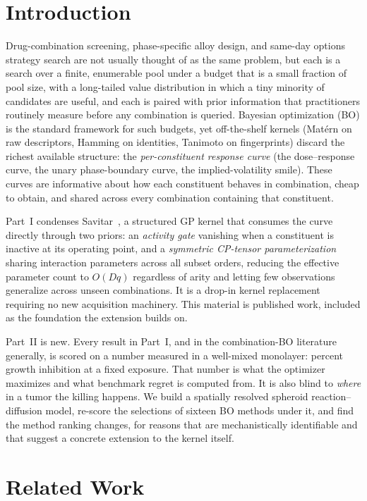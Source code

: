\documentclass{article}
\begin{document}
\section{Introduction}

Drug-combination screening, phase-specific alloy design, and same-day options
strategy search are not usually thought of as the same problem, but each is a
search over a finite, enumerable pool under a budget that is a small fraction
of pool size, with a long-tailed value distribution in which a tiny minority
of candidates are useful, and each is paired with prior information that
practitioners routinely measure before any combination is queried. Bayesian
optimization (BO) is the standard framework for such budgets, yet
off-the-shelf kernels (Mat\'ern on raw descriptors, Hamming on identities,
Tanimoto on fingerprints) discard the richest available structure: the
\emph{per-constituent response curve} (the dose--response curve, the unary
phase-boundary curve, the implied-volatility smile). These curves are
informative about how each constituent behaves in combination, cheap to
obtain, and shared across every combination containing that constituent.

Part~I condenses Savitar~\citep{gonehal2026savitar}, a structured GP kernel that consumes the curve
directly through two priors: an \emph{activity gate} vanishing when a
constituent is inactive at its operating point, and a \emph{symmetric
CP-tensor parameterization} sharing interaction parameters across all subset
orders, reducing the effective parameter count to $O(Dq)$ regardless of
arity and letting few observations generalize across unseen combinations.
It is a drop-in kernel replacement requiring no new acquisition machinery.
This material is published work, included as the foundation the extension
builds on.

Part~II is new. Every result in Part~I, and in the combination-BO literature
generally, is scored on a number measured in a well-mixed monolayer: percent
growth inhibition at a fixed exposure. That number is what the optimizer
maximizes and what benchmark regret is computed from. It is also blind to
\emph{where} in a tumor the killing happens. We build a spatially resolved
spheroid reaction--diffusion model, re-score the selections of sixteen BO
methods under it, and find the method ranking changes, for reasons that are
mechanistically identifiable and that suggest a concrete extension to the
kernel itself.

\section{Related Work}
\end{document}
